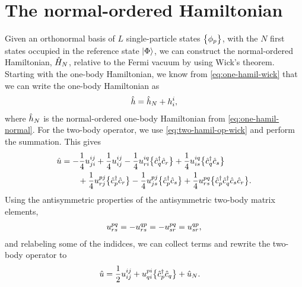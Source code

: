     \section{The normal-ordered Hamiltonian}
        \label{app:normal-ordered-hamiltonian}
        Given an orthonormal basis of $L$ single-particle states
        $\left\{ \phi_p \right\}$, with the $N$ first states occupied in the reference
        state $\ket{\Phi}$, we can construct the normal-ordered Hamiltonian,
        $\hat{H}_N$, relative to the Fermi vacuum by using Wick's theorem.
        Starting with the one-body Hamiltonian, we know from
        \autoref{eq:one-hamil-wick} that we can write the one-body Hamiltonian
        as
        \begin{align}
            \hat{h} = \hat{h}_N + h^{i}_{i},
        \end{align}
        where $\hat{h}_N$ is the normal-ordered one-body Hamiltonian from
        \autoref{eq:one-hamil-normal}.
        For the two-body operator, we use \autoref{eq:two-hamil-op-wick} and
        perform the summation.
        This gives
        \begin{align}
            \hat{u}
            &=
            - \frac{1}{4}u^{ij}_{ji}
            + \frac{1}{4}u^{ij}_{ij}
            - \frac{1}{4}u^{iq}_{ri}\bigl\{ 
                \hat{c}_{q}^{\dagger}
                \hat{c}_{r}
             \bigr\}
            + \frac{1}{4}u^{iq}_{is}\bigl\{ 
                \hat{c}_{q}^{\dagger}
                \hat{c}_{s}
             \bigr\}
            \nonumber \\
            &\qquad
            + \frac{1}{4}u^{pj}_{rj}\bigl\{ 
                \hat{c}_{p}^{\dagger}
                \hat{c}_{r}
             \bigr\}
            - \frac{1}{4}u^{pj}_{js}\bigl\{ 
                \hat{c}_{p}^{\dagger}
                \hat{c}_{s}
             \bigr\}
            + \frac{1}{4}u^{pq}_{rs}\bigl\{ 
                \hat{c}_{p}^{\dagger}
                \hat{c}_{q}^{\dagger}
                \hat{c}_{s}
                \hat{c}_{r}
             \bigr\}.
        \end{align}
        Using the antisymmetric properties of the antisymmetric two-body
        matrix elements,
        \begin{align}
            u^{pq}_{rs}
            =
            -u^{qp}_{rs}
            =
            -u^{pq}_{sr}
            =
            u^{qp}_{sr},
        \end{align}
        and relabeling some of the indidces, we can collect terms and rewrite
        the two-body operator to
        \begin{align}
            \hat{u}
            &=
            \frac{1}{2} u^{ij}_{ij}
            + u^{pi}_{qi}\bigl\{ 
                \hat{c}_{p}^{\dagger}
                \hat{c}_{q}
             \bigr\}
            + \hat{u}_N.
        \end{align}
